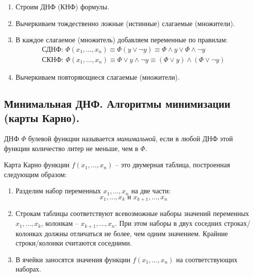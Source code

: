 \begin{note}\leavevmode
    \begin{enumerate}
        \item Строим ДНФ (КНФ) формулы.
        \item Вычеркиваем тождественно ложные (истинные) слагаемые (множители).
        \item В каждое слагаемое (множитель) добавляем переменные по правилам:
              \[
                  \begin{array}{l}
                      \text{СДНФ: }\Phi(x_1,\ldots,x_n) \equiv \Phi(y \lor \lnot y) \equiv \Phi \land y \lor \Phi \land \lnot y \\
                      \text{СКНФ: }\Phi(x_1,\ldots,x_n) \equiv \Phi \lor y \land \lnot y \equiv (\Phi \lor y)\land(\Phi \lor \lnot y)
                  \end{array}
              \]
        \item Вычеркиваем повторяющиеся слагаемые (множители).
    \end{enumerate}
\end{note}

\subsection{Минимальная ДНФ. Алгоритмы минимизации (карты Карно).}

\begin{definition}
    ДНФ $\Phi$ булевой функции называется \emph{минимальной}, если в любой ДНФ этой функции количество литер не меньше, чем в $\Phi$.
\end{definition}

\begin{definition}
    Карта Карно функции $f(x_1,\ldots,x_n)$ -- это двумерная таблица, построенная следующим образом:
    \begin{enumerate}
        \item Разделим набор переменных $x_1,\ldots,x_n$ на две части:
              \[
                  x_1,\ldots,x_k\text{ и }x_{k+1},\ldots,x_n
              \]
        \item Строкам таблицы соответствуют всевозможные наборы значений переменных $x_1,\ldots,x_k$, колонкам -- $x_{k+1},\ldots,x_n$. При этом наборы в двух соседних строках/колонках должны отличаться не более, чем одним значением. Крайние строки/колонки считаются соседними.
        \item В ячейки заносятся значения функции $f(x_1,\ldots,x_n)$ на соответствующих наборах.
    \end{enumerate}
\end{definition}

